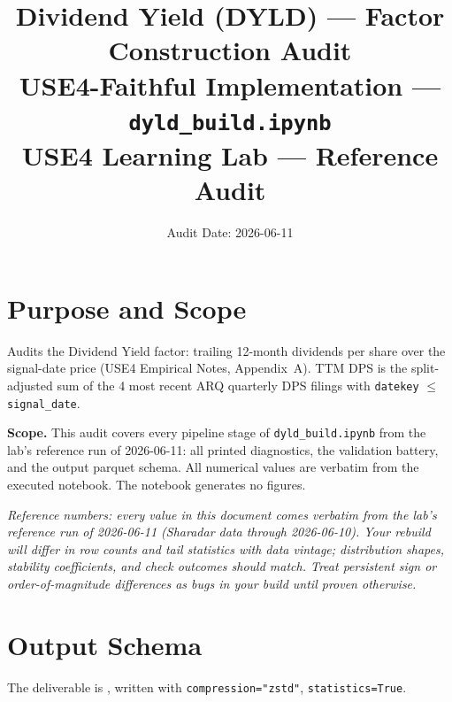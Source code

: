 \documentclass[11pt,a4paper]{article}
\title{\textbf{Dividend Yield (DYLD) --- Factor Construction Audit}\\[2pt]
\large USE4-Faithful Implementation --- \texttt{dyld\_build.ipynb}\\[4pt]
\normalsize USE4 Learning Lab --- Reference Audit}
\author{Audit Date: 2026-06-11}
\date{}
\newcommand{\NOTE}[1]{\textcolor{note}{\textit{#1}}}
\begin{document}
\maketitle
\tableofcontents
\newpage

\section{Purpose and Scope}

Audits the Dividend Yield factor: trailing 12-month dividends per
share over the signal-date price (USE4 Empirical Notes, Appendix~A). TTM DPS is
the split-adjusted sum of the 4 most recent ARQ quarterly DPS filings with
\texttt{datekey} $\leq$ \texttt{signal\_date}.

\smallskip
\textbf{Scope.} This audit covers every pipeline stage of
\texttt{dyld\_build.ipynb} from the lab's reference run of 2026-06-11: all printed diagnostics, the
validation battery, and the output parquet schema. All numerical values are
verbatim from the executed notebook. The notebook generates no figures.

\NOTE{Reference numbers: every value in this document comes verbatim from the lab's reference run of 2026-06-11 (Sharadar data through 2026-06-10). Your rebuild will differ in row counts and tail statistics with data vintage; distribution shapes, stability coefficients, and check outcomes should match. Treat persistent sign or order-of-magnitude differences as bugs in your build until proven otherwise.}


\section{Output Schema}

The deliverable is , written with
\texttt{compression="zstd"}, \newline\texttt{statistics=True}.
\end{document}

